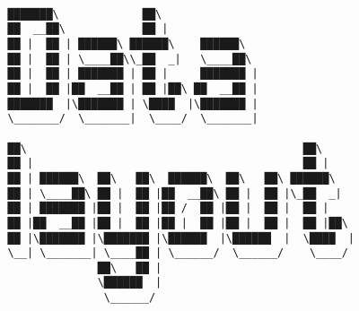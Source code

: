 \documentclass[varwidth=\maxdimen,margin=0.5cm,multi={verbatim}]{standalone}
\begin{document}
\begin{verbatim}

         ███████\             ██\                              
         ██  __██\            ██ |                             
         ██ |  ██ | ██████\ ██████\    ██████\                 
         ██ |  ██ | \____██\\_██  _|   \____██\                
         ██ |  ██ | ███████ | ██ |     ███████ |               
         ██ |  ██ |██  __██ | ██ |██\ ██  __██ |               
         ███████  |\███████ | \████  |\███████ |               
         \_______/  \_______|  \____/  \_______|               
                                                               
         ██\                                           ██\     
         ██ |                                          ██ |    
         ██ | ██████\  ██\   ██\  ██████\  ██\   ██\ ██████\   
         ██ | \____██\ ██ |  ██ |██  __██\ ██ |  ██ |\_██  _|  
         ██ | ███████ |██ |  ██ |██ /  ██ |██ |  ██ |  ██ |    
         ██ |██  __██ |██ |  ██ |██ |  ██ |██ |  ██ |  ██ |██\ 
         ██ |\███████ |\███████ |\██████  |\██████  |  \████  |
         \__| \_______| \____██ | \______/  \______/    \____/ 
                       ██\   ██ |                              
                       \██████  |                              
                        \______/





\end{verbatim}
\end{document}
